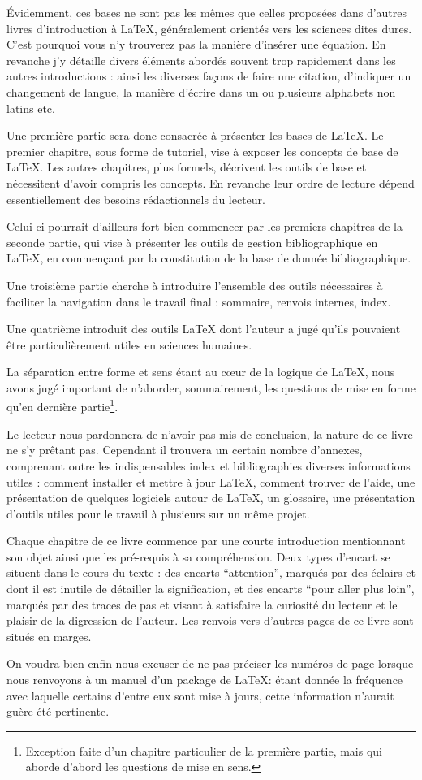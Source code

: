 Évidemment, ces bases ne sont pas les mêmes que celles proposées dans d'autres livres d'introduction à \LaTeX{}, généralement orientés vers les sciences dites dures. 
C'est pourquoi vous n'y trouverez pas la manière d'insérer une équation. En revanche j'y détaille divers éléments abordés souvent trop rapidement dans les autres introductions : ainsi les diverses façons de faire une citation, d'indiquer un changement de langue, la manière d'écrire dans un ou plusieurs alphabets non latins etc.

Une première partie sera donc consacrée à présenter les bases de \LaTeX. Le premier chapitre, sous forme de tutoriel, vise à exposer les concepts de base de \LaTeX. Les autres chapitres, plus formels, décrivent les outils de base et nécessitent d'avoir compris les concepts. En revanche leur ordre de lecture dépend essentiellement des besoins rédactionnels du lecteur. 

Celui-ci pourrait d'ailleurs fort bien commencer par les premiers chapitres de la seconde partie, qui vise à présenter les outils de gestion bibliographique en \LaTeX{}, en commençant par la constitution de la base de donnée bibliographique.

Une troisième partie cherche à introduire l'ensemble des outils nécessaires à faciliter la navigation dans le travail final : sommaire, renvois internes, index.

Une quatrième introduit des outils \LaTeX{} dont l'auteur a jugé qu'ils pouvaient être particulièrement utiles en sciences humaines.

La séparation entre forme et sens étant au cœur de la logique de \LaTeX{}, nous avons jugé important  de n'aborder, sommairement,  les questions de mise en forme qu'en dernière partie\footnote{Exception faite d'un chapitre particulier de la première partie, mais qui aborde d'abord les questions de mise en sens.}.

Le lecteur nous pardonnera de n'avoir pas mis de conclusion, la nature de ce livre ne s'y prêtant pas. Cependant il trouvera un certain nombre d'annexes, comprenant outre les indispensables index et bibliographies diverses informations utiles : comment installer et mettre à jour  \LaTeX{}, comment trouver de l'aide, une présentation de quelques logiciels autour de \LaTeX{}, un glossaire, une présentation d'outils utiles pour le travail à plusieurs sur un même projet.

Chaque chapitre de ce livre commence par une courte introduction mentionnant son objet ainsi que les pré-requis à sa compréhension. Deux types d'encart se situent dans le cours du texte : des encarts \enquote{attention}, marqués par des éclairs et dont il est inutile de détailler la signification, et des encarts \enquote{pour aller plus loin}, marqués par des traces de pas et visant à satisfaire la curiosité du lecteur et le plaisir de la digression de l'auteur. Les renvois vers d'autres pages de ce livre sont situés en marges.

On voudra bien enfin nous excuser de ne pas préciser les numéros de page lorsque nous renvoyons à un manuel d'un package de \LaTeX : étant donnée la fréquence avec laquelle certains d'entre eux sont mise à jours, cette information n'aurait guère été pertinente.
